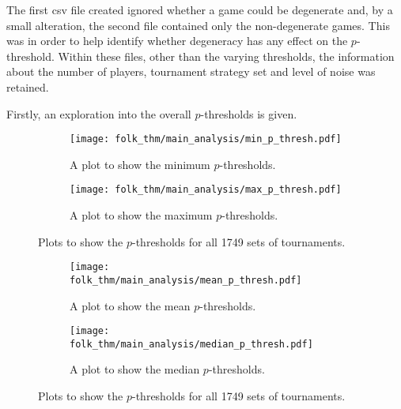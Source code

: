 The first csv file created ignored whether a game could be degenerate and, by a
small alteration, the second file contained only the non-degenerate games. This
was in order to help identify whether degeneracy has any effect on the
\(p\)-threshold. Within these files, other than the varying thresholds, the
information about the number of players, tournament strategy set and level of
noise was retained.

Firstly, an exploration into the overall \(p\)-thresholds is given.

\begin{figure}
    \begin{subfigure}{.45\textwidth}
        \centering
        \texttt{[image: folk\_thm/main\_analysis/min\_p\_thresh.pdf]}
        \caption{A plot to show the minimum \(p\)-thresholds.}\label{subfig:min_p_thresh}
    \end{subfigure}
    \begin{subfigure}{.45\textwidth}
        \centering
        \texttt{[image: folk\_thm/main\_analysis/max\_p\_thresh.pdf]}
        \caption{A plot to show the maximum \(p\)-thresholds.}\label{subfig:max_p_thresh}
    \end{subfigure}
    \caption{Plots to show the \(p\)-thresholds for all 1749 sets of tournaments.}\label{fig:min_max_p_thresh}
\end{figure}


\begin{figure}
    \begin{subfigure}{.45\textwidth}
        \centering
        \texttt{[image: folk\_thm/main\_analysis/mean\_p\_thresh.pdf]}
        \caption{A plot to show the mean \(p\)-thresholds.}\label{subfig:mean_p_thresh}
    \end{subfigure}
    \begin{subfigure}{.45\textwidth}
        \centering
        \texttt{[image: folk\_thm/main\_analysis/median\_p\_thresh.pdf]}
        \caption{A plot to show the median \(p\)-thresholds.}\label{subfig:median_p_thresh}
    \end{subfigure}
    \caption{Plots to show the \(p\)-thresholds for all 1749 sets of tournaments.}\label{fig:mean_median_p_thresh}
\end{figure}





